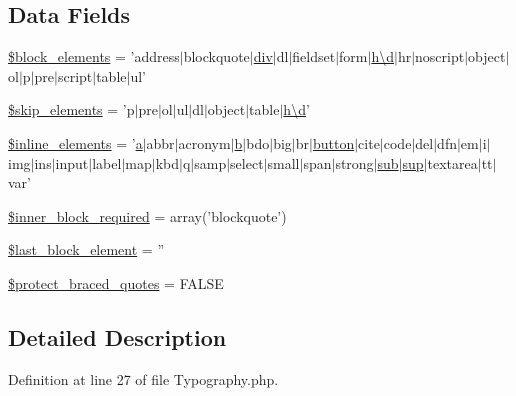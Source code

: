 \subsection*{Data Fields}
\begin{DoxyCompactItemize}
\item 
\hyperlink{class_c_i___typography_ac99f5bbe8e02dc1147e9a4205dc161eb}{\$block\-\_\-elements} = 'address$|$blockquote$|$\hyperlink{mathquill_8js_a7faab0faa1bacc23a7ffe6f0c7c26e76}{div}$|$dl$|$fieldset$|$form$|$\hyperlink{bootstrap_8min_8js_aeb337d295abaddb5ec3cb34cc2e2bbc9}{h\textbackslash{}d}$|$hr$|$noscript$|$object$|$ol$|$p$|$pre$|$script$|$table$|$ul'
\item 
\hyperlink{class_c_i___typography_a80c70a349bff88ad1ef94dea8753bc2e}{\$skip\-\_\-elements} = 'p$|$pre$|$ol$|$ul$|$dl$|$object$|$table$|$\hyperlink{bootstrap_8min_8js_aeb337d295abaddb5ec3cb34cc2e2bbc9}{h\textbackslash{}d}'
\item 
\hyperlink{class_c_i___typography_a7ee5f0598125dc7e6b17a08aa6da384f}{\$inline\-\_\-elements} = '\hyperlink{bootstrap_8min_8js_a7318f59fb86a4437995ee89c780c51ac}{a}$|$abbr$|$acronym$|$\hyperlink{bootstrap_8min_8js_a7c192e47b11481e4717b9f1e04eb4420}{b}$|$bdo$|$big$|$br$|$\hyperlink{bootstrap_8min_8js_a55e170814e74f6c3db8ae9ea3ba9054f}{button}$|$cite$|$code$|$del$|$dfn$|$em$|$i$|$img$|$ins$|$input$|$label$|$map$|$kbd$|$q$|$samp$|$select$|$small$|$span$|$strong$|$\hyperlink{mathquill_8js_ad9edb82c135b4606f1000cd5b6ee419e}{sub}$|$\hyperlink{mathquill_8js_afd57ca60d70666976316bfa9317678d6}{sup}$|$textarea$|$tt$|$var'
\item 
\hyperlink{class_c_i___typography_a822eaf22f556c5c52bd766779d9ee22f}{\$inner\-\_\-block\-\_\-required} = array('blockquote')
\item 
\hyperlink{class_c_i___typography_a8d5c4b7f2f7b74e118c682cf95688e22}{\$last\-\_\-block\-\_\-element} = ''
\item 
\hyperlink{class_c_i___typography_a6a74364571da23cc7187c864cde167ca}{\$protect\-\_\-braced\-\_\-quotes} = F\-A\-L\-S\-E
\end{DoxyCompactItemize}


\subsection{Detailed Description}


Definition at line 27 of file Typography.\-php.



